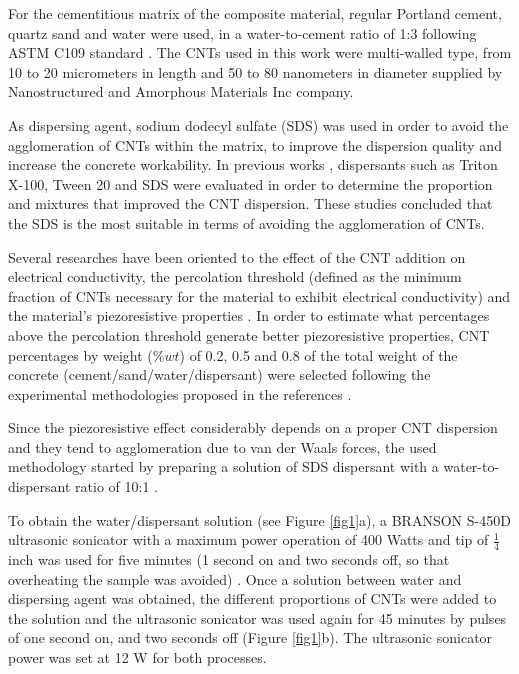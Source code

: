 \documentclass[twocolumn]{bmcart}%
\begin{document}
For the cementitious matrix of the composite material, regular Portland cement, quartz sand and water were used, in a water-to-cement ratio of 1:3 following ASTM C109 standard \cite{ASTMC1092000}. The CNTs used in this work were multi-walled type, from 10 to 20 micrometers in length and 50 to 80 nanometers in diameter supplied by Nanostructured and Amorphous Materials Inc company.

As dispersing agent, sodium dodecyl sulfate (SDS) was used in order to avoid the agglomeration of CNTs within the matrix, to improve the dispersion quality and increase the concrete workability. In previous works \cite{Castaneda-Saldarriaga2019, Kyrylyuk2008, Shao2017, Myung2014, Sasmal2017, Rehman2018}, dispersants such as Triton X-100, Tween 20 and SDS were evaluated in order to determine the proportion and mixtures that improved the CNT dispersion. These studies concluded that the SDS is the most suitable in terms of avoiding the agglomeration of CNTs.

Several researches have been oriented to the effect of the CNT addition on electrical conductivity, the percolation threshold (defined as the minimum fraction of CNTs necessary for the material to exhibit electrical conductivity) and the material’s piezoresistive properties \cite{Garcia-Macias2017, Baeza2013a, Yoo2018a}. In order to estimate what percentages above the percolation threshold generate better piezoresistive properties, CNT percentages by weight ($\%wt$) of 0.2, 0.5 and 0.8 of the total weight of the concrete (cement/sand/water/dispersant) were selected following the experimental methodologies proposed in the references \cite{Coppola2011, Downey2017a, Cui2013}.

Since the piezoresistive effect considerably depends on a proper CNT dispersion and they tend to agglomeration due to van der Waals forces, the used methodology started by preparing a solution of SDS dispersant with a water-to-dispersant ratio of 10:1 \cite{Shao2017, Noh2013, Lee2017, Collins2012}.

To obtain the water/dispersant solution (see Figure \ref{fig1}a), a BRANSON S-450D ultrasonic sonicator  with a maximum power operation of 400 Watts and tip of $\frac{1}{4}$ inch was used for five minutes (1 second on and two seconds off, so that overheating the sample was  avoided) \cite{Konsta-gdoutos2010, Konsta-Gdoutos2014}. Once a solution between water and dispersing agent was obtained, the different proportions of CNTs were added to the solution and the ultrasonic sonicator was used again for 45 minutes by pulses of one second on, and two seconds off (Figure \ref{fig1}b). The ultrasonic sonicator power was set at 12 W for both processes.
\end{document}
